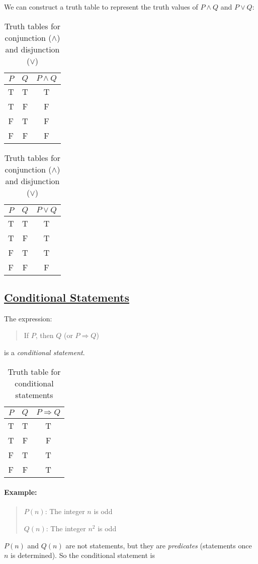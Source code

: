 \documentclass[../main.tex]{subfiles}
\begin{document}
We can construct a truth table to represent the truth values of $P \land Q$ and $P \lor Q$:
\begin{table}[ht]
    \centering
    \begin{tabular}{c|c|c}
        $P$ & $Q$ & $P \land Q$ \\
        \hline
        T & T & T \\
        T & F & F \\
        F & T & F \\
        F & F & F
    \end{tabular}
    \hspace{2cm}
    \begin{tabular}{c|c|c}
        $P$ & $Q$ & $P \lor Q$ \\
        \hline
        T & T & T \\
        T & F & T \\
        F & T & T \\
        F & F & F
    \end{tabular}
    \caption{Truth tables for conjunction ($\land$) and disjunction ($\lor$)}
\end{table}

\subsection*{\underline{Conditional Statements}}

The expression:
\begin{quote}
    If $P$, then $Q$ (or $P \Rightarrow Q$)
\end{quote}
is a \emph{conditional statement}.
\begin{table}[ht]
    \centering
    \begin{tabular}{c|c|c}
        $P$ & $Q$ & $P \Rightarrow Q$ \\
        \hline
        T & T & T \\
        T & F & F \\
        F & T & T \\
        F & F & T
    \end{tabular}
    \caption{Truth table for conditional statements}
\end{table}

\paragraph{Example:}
\begin{quote}
    $P(n)$: The integer $n$ is odd

    $Q(n)$: The integer $n^2$ is odd
\end{quote}
$P(n)$ and $Q(n)$ are not statements, but they are \emph{predicates} (statements once $n$ is
determined). So the conditional statement is
\end{document}
